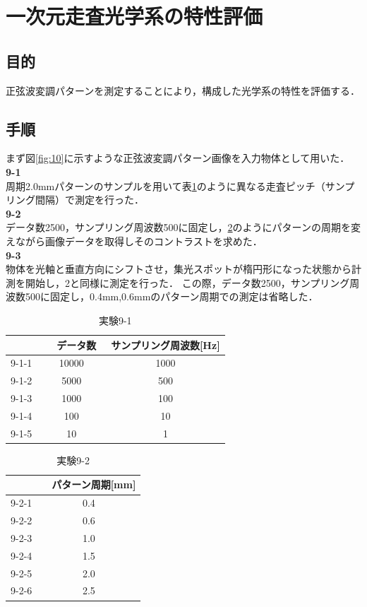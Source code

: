 \documentclass[11pt, a4paper,twocolumn]{jarticle}
\begin{document}
\section{一次元走査光学系の特性評価}
\subsection{目的}
正弦波変調パターンを測定することにより，構成した光学系の特性を評価する．

\subsection{手順}
まず図\ref{fig:10}に示すような正弦波変調パターン画像を入力物体として用いた． \\

\noindent
\textbf{9-1} \\
周期2.0mmパターンのサンプルを用いて表\ref{fig:foo}のように異なる走査ピッチ（サンプリング間隔）で測定を行った． \\

\noindent
\textbf{9-2} \\
データ数2500，サンプリング周波数500に固定し，\ref{fig:foofoo}のようにパターンの周期を変えながら画像データを取得しそのコントラストを求めた． \\

\noindent
\textbf{9-3} \\
物体を光軸と垂直方向にシフトさせ，集光スポットが楕円形になった状態から計測を開始し，2と同様に測定を行った．
この際，データ数2500，サンプリング周波数500に固定し，0.4mm,0.6mmのパターン周期での測定は省略した．

\begin{table}[ht]
\centering
\caption{実験9-1}
\begin{tabular}{c c c}
\hline
 &　データ数　& サンプリング周波数[Hz] \\ \hline
9-1-1 & 10000 & 1000 \\
9-1-2 & 5000 & 500 \\
9-1-3 & 1000 & 100 \\
9-1-4 & 100 & 10 \\
9-1-5 & 10 & 1 \\
\end{tabular}
\label{fig:foo}
\end{table}

\begin{table}[ht]
\centering
\caption{実験9-2}
\begin{tabular}{c c}
\hline
 &　パターン周期[mm]\\ \hline
9-2-1 & 0.4 \\
9-2-2 & 0.6 \\
9-2-3 & 1.0 \\
9-2-4 & 1.5 \\
9-2-5 & 2.0 \\
9-2-6 & 2.5 \\
\end{tabular}
\label{fig:foofoo}
\end{table}
\end{document}
